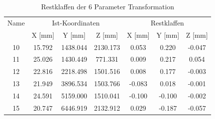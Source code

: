 \begin{table}[H]\label{tab:restklaffen6p}
\centering
\caption{Restklaffen der 6 Parameter Transformation}

\begin{tabular}{ccccccc}
\toprule
\multicolumn{1}{p{1.5cm}|}{Name} &
\multicolumn{3}{c|}{Ist-Koordinaten} &
\multicolumn{3}{c}{Restklaffen} \\
\multicolumn{1}{p{2cm}|}{} &
\multicolumn{1}{p{2cm}|}{X [mm]} &
\multicolumn{1}{p{2cm}|}{Y [mm]} &
\multicolumn{1}{p{2cm}|}{Z [mm]} &
\multicolumn{1}{p{2cm}|}{X [mm]} &
\multicolumn{1}{p{2cm}|}{Y [mm]} &
\multicolumn{1}{p{2cm}}{Z [mm]} \\
\midrule

\multicolumn{1}{p{2cm}|}{10} &
\multicolumn{1}{p{2cm}|}{15.792} &
\multicolumn{1}{p{2cm}|}{1438.044} &
\multicolumn{1}{p{2cm}|}{2130.173} &
\multicolumn{1}{p{2cm}|}{0.053} &
\multicolumn{1}{p{2cm}|}{0.220} &
\multicolumn{1}{p{2cm}}{-0.047} \\

\multicolumn{1}{p{2cm}|}{11} &
\multicolumn{1}{p{2cm}|}{25.026} &
\multicolumn{1}{p{2cm}|}{1430.449} &
\multicolumn{1}{p{2cm}|}{771.331} &
\multicolumn{1}{p{2cm}|}{0.009} &
\multicolumn{1}{p{2cm}|}{0.217} &
\multicolumn{1}{p{2cm}}{0.054} \\

\multicolumn{1}{p{2cm}|}{12} &
\multicolumn{1}{p{2cm}|}{22.816} &
\multicolumn{1}{p{2cm}|}{2218.498} &
\multicolumn{1}{p{2cm}|}{1501.516} &
\multicolumn{1}{p{2cm}|}{0.008} &
\multicolumn{1}{p{2cm}|}{0.177} &
\multicolumn{1}{p{2cm}}{-0.003} \\

\multicolumn{1}{p{2cm}|}{13} &
\multicolumn{1}{p{2cm}|}{21.949} &
\multicolumn{1}{p{2cm}|}{3896.534} &
\multicolumn{1}{p{2cm}|}{1503.766} &
\multicolumn{1}{p{2cm}|}{-0.083} &
\multicolumn{1}{p{2cm}|}{0.018} &
\multicolumn{1}{p{2cm}}{-0.001} \\

\multicolumn{1}{p{2cm}|}{14} &
\multicolumn{1}{p{2cm}|}{24.591} &
\multicolumn{1}{p{2cm}|}{5159.000} &
\multicolumn{1}{p{2cm}|}{1510.041} &
\multicolumn{1}{p{2cm}|}{-0.100} &
\multicolumn{1}{p{2cm}|}{-0.100} &
\multicolumn{1}{p{2cm}}{-0.002} \\

\multicolumn{1}{p{2cm}|}{15} &
\multicolumn{1}{p{2cm}|}{20.747} &
\multicolumn{1}{p{2cm}|}{6446.919} &
\multicolumn{1}{p{2cm}|}{2132.912} &
\multicolumn{1}{p{2cm}|}{0.029} &
\multicolumn{1}{p{2cm}|}{-0.187} &
\multicolumn{1}{p{2cm}}{-0.057} \\


\end{tabular}
\end{table}
